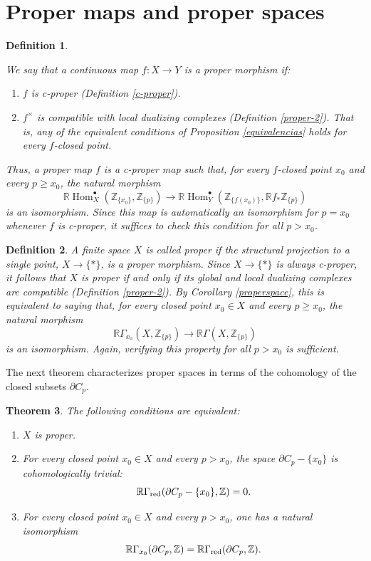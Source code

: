 \documentclass[amssymb,amscd,11pt,20pt]{amsart}
\newcommand{\ZZ}{{\mathbb Z}}
\newcommand{\RR}{\mathbb R}
\newcommand{\0}{\mathbf 0}
\DeclareMathOperator{\Hom}{{Hom}}
\newcommand{\pun}{{\scriptscriptstyle \bullet}}
\theoremstyle{plain}
\newtheorem{thm}{Theorem}[section]
\newtheorem{defn}[thm]{Definition}
\numberwithin{equation}{thm}
\begin{document}
\section{Proper maps and proper spaces}\label{section-properness}





\begin{defn}\label{defn-proper} {\rm We say that a continuous map $f\colon X\to Y$ is a  {\em proper morphism} if:
\begin{enumerate} 
\item $f$ is c-proper (Definition \ref{c-proper}).
\item  $f^\times$ is compatible with local dualizing complexes (Definition \ref{proper-2}). That is,  any of the equivalent conditions of Proposition \ref{equivalencias} holds for every $f$-closed point.
\end{enumerate} Thus, a proper map $f$ is a c-proper map such that,  for every $f$-closed point $x_0$ and every $p\geq x_0$, the natural morphism
\begin{equation}\label{proper-condition}\RR\Hom_X^\pun(\ZZ_{\{x_0\}} , \ZZ_{\{p\}}) \to \RR\Hom^\pun_Y(\ZZ_{\{f(x_0)\}} , \RR f_*\ZZ_{\{p\}})\end{equation} is an isomorphism. Since this map is automatically an isomorphism for  $p=x_0$ whenever $f$ is c-proper, it suffices to check this condition for all  $p>x_0$.}
\end{defn}

\begin{defn} {\rm A finite space $X$ is called {\em proper}   if the structural projection to a single point, $X\to\{*\}$, is a proper morphism. Since $X\to\{*\}$ is always c-proper, it follows that $X$ is proper if and only if its global and local dualizing complexes are compatible (Definition \ref{proper-2}). By Corollary \ref{properspace}, this is equivalent to saying that, for every closed point  $x_0\in X$ and every $p\geq x_0$, the natural morphism $$\RR\Gamma_{x_0}(X,\ZZ_{\{p\}})\to \RR\Gamma (X,\ZZ_{\{p\}})$$ is an isomorphism. Again,     verifying this property for all $p>x_0$ is sufficient.
 }
\end{defn}

The next theorem characterizes proper spaces in terms of the cohomology of the closed subsets $\partial C_p$.

\begin{thm}\label{thmproperspace} The following conditions are equivalent:
\begin{enumerate}\item $X$ is proper.
\item  For every closed point $x_0\in X$ and every $p>x_0 $, the space $\partial C_p-\{x_0\}$ is cohomologically trivial: 
\[ \RR\Gamma_{\text{\rm red}}( \partial C_p-\{x_0\},\ZZ)=0.\]
\item For every closed point $x_0\in X$ and every $p>x_0 $, one has a natural isomorphism
\[ \RR\Gamma_{x_0}(\partial C_p,\ZZ) = \RR\Gamma_{\text{\rm red}}(\partial C_p,\ZZ).\]
\end{enumerate}   
\end{thm}
\end{document}
